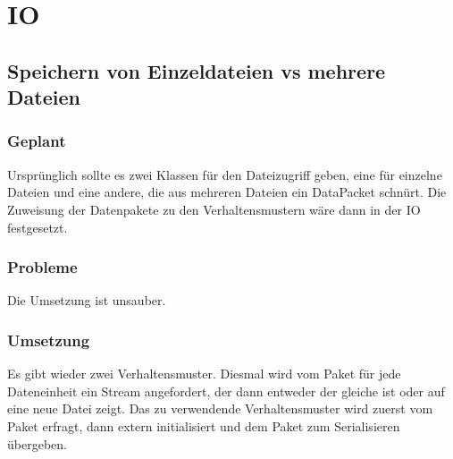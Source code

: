 \section{IO}
\subsection{Speichern von Einzeldateien vs mehrere Dateien}
\subsubsection{Geplant}
Ursprünglich sollte es zwei Klassen für den Dateizugriff geben, eine für einzelne Dateien und eine andere, die aus mehreren Dateien ein DataPacket schnürt. Die Zuweisung der Datenpakete zu den Verhaltensmustern wäre dann in der IO festgesetzt.
\subsubsection{Probleme}
Die Umsetzung ist unsauber.
\subsubsection{Umsetzung}
Es gibt wieder zwei Verhaltensmuster. Diesmal wird vom Paket für jede Dateneinheit ein Stream angefordert, der dann entweder der gleiche ist oder auf eine neue Datei zeigt. Das zu verwendende Verhaltensmuster wird zuerst vom Paket erfragt, dann extern initialisiert und dem Paket zum Serialisieren übergeben.